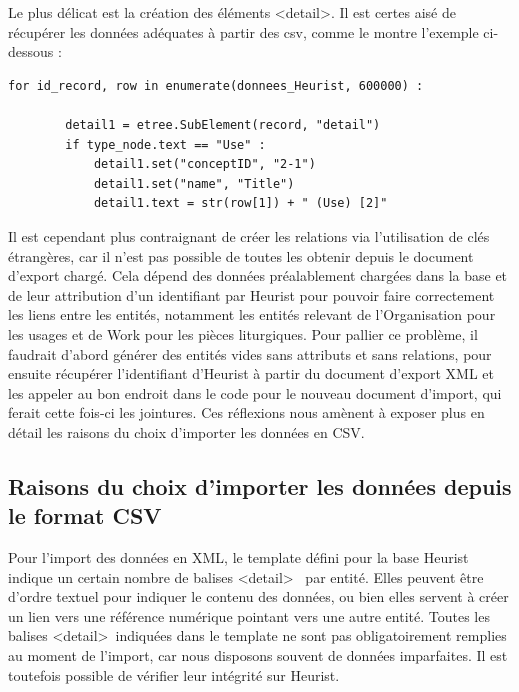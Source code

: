 \documentclass[a4paper,12pt,twoside]{book}
\begin{document}
Le plus délicat est la création des éléments \textless detail\textgreater . Il est certes aisé de récupérer les données adéquates à partir des csv, comme le montre l'exemple ci-dessous : 
\begin{verbatim}
for id_record, row in enumerate(donnees_Heurist, 600000) :

        detail1 = etree.SubElement(record, "detail")
        if type_node.text == "Use" :
            detail1.set("conceptID", "2-1")
            detail1.set("name", "Title")
            detail1.text = str(row[1]) + " (Use) [2]"

\end{verbatim}
Il est cependant plus contraignant de créer les relations via l'utilisation de clés étrangères, car il n'est pas possible de toutes les obtenir depuis le document d'export chargé. Cela dépend des données préalablement chargées dans la base et de leur attribution d'un identifiant par Heurist pour pouvoir faire correctement les liens entre les entités, notamment les entités relevant de l'\og Organisation\fg{} pour les usages et de \og Work\fg{} pour les pièces liturgiques. Pour pallier ce problème, il faudrait d'abord générer des entités vides sans attributs et sans relations, pour ensuite récupérer l'identifiant d'Heurist à partir du document d'export XML et les appeler au bon endroit dans le code pour le nouveau document d'import, qui ferait cette fois-ci les jointures. Ces réflexions nous amènent à exposer plus en détail les raisons du choix d'importer les données en CSV. 

	
	\subsection{Raisons du choix d’importer les données depuis le format CSV}
	
Pour l'import des données en XML, le template défini pour la base Heurist indique un certain nombre de balises \textless detail\textgreater~ par entité. Elles peuvent être d'ordre textuel pour indiquer le contenu des données, ou bien elles servent à créer un lien vers une référence numérique pointant vers une autre entité. Toutes les balises \textless detail\textgreater~indiquées dans le template ne sont pas obligatoirement remplies au moment de l'import, car nous disposons souvent de données imparfaites. Il est toutefois possible de vérifier leur intégrité sur Heurist.
	
\end{document}
